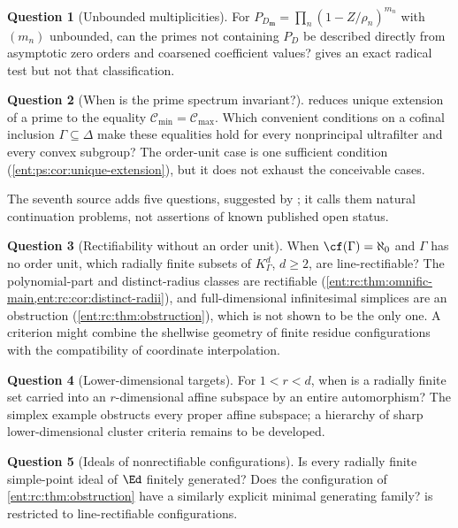 \documentclass[11pt]{article}
\theoremstyle{plain}
\theoremstyle{plain}
\theoremstyle{plain}
\theoremstyle{definition}
\theoremstyle{definition}
\theoremstyle{definition}
\theoremstyle{definition}
\newtheorem{question}[question]{Question}
\theoremstyle{remark}
\newcommand{\K}{K_\Gamma}\newcommand{\KD}{K_\Delta}
\begin{document}
\begin{question}[Unbounded multiplicities]\label{ent:ps:q:unbounded}
For $P_{D_{\mathbf m}}=\prod_n(1-Z/\rho_n)^{m_n}$ with $(m_n)$ unbounded, can
the primes not containing $P_D$ be described directly from asymptotic zero
orders and coarsened coefficient values?  gives
an exact radical test but not that classification.
\end{question}

\begin{question}[When is the prime spectrum invariant?]
\label{ent:ps:q:invariance}
 reduces unique extension of a prime to the
equality $\mathcal C_{\min}=\mathcal C_{\max}$. Which convenient conditions on
a cofinal inclusion $\Gamma\subseteq\Delta$ make these equalities hold for
every nonprincipal ultrafilter and every convex subgroup? The order-unit case
is one sufficient condition (\cref{ent:ps:cor:unique-extension}), but it does
not exhaust the conceivable cases.
\end{question}

The seventh source adds five questions, suggested by
; it calls them natural
continuation problems, not assertions of known published open status.

\begin{question}[Rectifiability without an order unit]\label{ent:rc:q:criterion}
When $\cf(\Gamma)=\aleph_0$ and $\Gamma$ has no order unit, which radially
finite subsets of $\K^d$, $d\ge2$, are line-rectifiable? The polynomial-part
and distinct-radius classes are rectifiable
(\cref{ent:rc:thm:omnific-main,ent:rc:cor:distinct-radii}), and
full-dimensional infinitesimal simplices are an obstruction
(\cref{ent:rc:thm:obstruction}), which is not shown to be the only one. A
criterion might combine the shellwise geometry of finite residue
configurations with the compatibility of coordinate interpolation.
\end{question}

\begin{question}[Lower-dimensional targets]\label{ent:rc:q:targets}
For $1<r<d$, when is a radially finite set carried into an $r$-dimensional
affine subspace by an entire automorphism? The simplex example obstructs every
proper affine subspace; a hierarchy of sharp lower-dimensional cluster
criteria remains to be developed.
\end{question}

\begin{question}[Ideals of nonrectifiable configurations]\label{ent:rc:q:ideals}
Is every radially finite simple-point ideal of $\Ed$ finitely generated? Does
the configuration of \cref{ent:rc:thm:obstruction} have a similarly explicit
minimal generating family?  is restricted to
line-rectifiable configurations.
\end{question}
\end{document}
